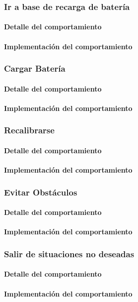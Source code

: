 \subsubsection{Ir a base de recarga de bater\'ia}
\label{go_to_recharge}
\paragraph{Detalle del comportamiento}
\paragraph{Implementaci\'on del comportamiento}

\subsubsection{Cargar Bater\'ia}
\label{recharge_battery}
\paragraph{Detalle del comportamiento}
\paragraph{Implementaci\'on del comportamiento}

\subsubsection{Recalibrarse}
\label{recalibrate}
\paragraph{Detalle del comportamiento}
\paragraph{Implementaci\'on del comportamiento}

\subsubsection{Evitar Obst\'aculos}
\label{avoid_obstacles}
\paragraph{Detalle del comportamiento}
\paragraph{Implementaci\'on del comportamiento}

\subsubsection{Salir de situaciones no deseadas}
\label{out_of_unwanted_situations}
\paragraph{Detalle del comportamiento}
\paragraph{Implementaci\'on del comportamiento}

